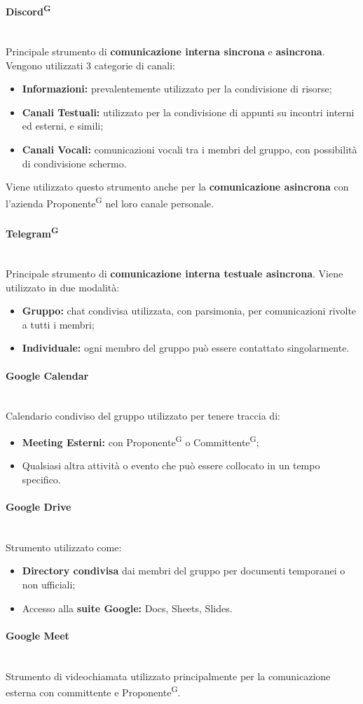 \documentclass[8pt]{article}
\newcommand{\glossterm}[1]{#1\textsuperscript{G}} %
\newcommand{\subsubsubsection}[1]{\paragraph{#1}\mbox{}\\}
\begin{document}
\subsubsubsection{\glossterm{Discord}}
Principale strumento di \textbf{comunicazione interna sincrona} e \textbf{asincrona}. Vengono utilizzati 3 categorie di canali:
\begin{itemize}
  \item \textbf{Informazioni:} prevalentemente utilizzato per la condivisione di risorse;
  \item \textbf{Canali Testuali:} utilizzato per la condivisione di appunti su incontri interni ed esterni, e simili;
  \item \textbf{Canali Vocali:} comunicazioni vocali tra i membri del gruppo, con possibilità di condivisione schermo.
\end{itemize}
\medskip
Viene utilizzato questo strumento anche per la \textbf{comunicazione asincrona} con l'azienda
\glossterm{Proponente} nel loro canale personale.

\subsubsubsection{\glossterm{Telegram}}
Principale strumento di \textbf{comunicazione interna testuale asincrona}. Viene utilizzato in due modalità:
\begin{itemize}
  \item \textbf{Gruppo:} chat condivisa utilizzata, con parsimonia, per comunicazioni rivolte a tutti i membri;
  \item \textbf{Individuale:} ogni membro del gruppo può essere contattato singolarmente.
\end{itemize}
\medskip

\subsubsubsection{Google Calendar}
Calendario condiviso del gruppo utilizzato per tenere traccia di:
\begin{itemize}
    \item \textbf{Meeting Esterni:} con \glossterm{Proponente} o \glossterm{Committente};
  \item Qualsiasi altra attività o evento che può essere collocato in un tempo specifico.
\end{itemize}
 
\subsubsubsection{Google Drive}
Strumento utilizzato come:
\begin{itemize}
  \item \textbf{Directory condivisa} dai membri del gruppo per documenti temporanei o non ufficiali;
  \item Accesso alla \textbf{suite Google:} Docs, Sheets, Slides.
\end{itemize}

\subsubsubsection{Google Meet}
Strumento di videochiamata utilizzato principalmente per la comunicazione esterna con committente e
\glossterm{Proponente}.
\end{document}
